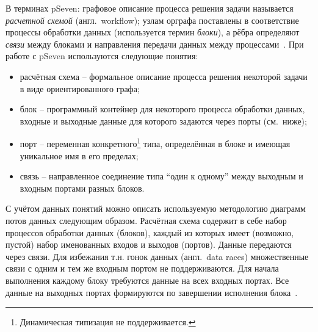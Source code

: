 В терминах \textsf{pSeven}: графовое описание процесса решения задачи называется \textit{расчетной схемой} (англ.~workflow); узлам орграфа поставлены в соответствие процессы обработки данных (используется термин \textit{блоки}), а рёбра определяют \textit{связи} между блоками и направления передачи данных между процессами~\cite{NazarenkoDFM2015}. При работе с pSeven используются следующие понятия:
\begin{itemize}
  \item \textsf{расчётная схема} -- формальное описание процесса решения некоторой задачи в виде ориентированного графа;
  \item \textsf{блок} -- программный контейнер для некоторого процесса обработки данных, входные и выходные данные для которого задаются через порты (см.~ниже);
  \item \textsf{порт} -- переменная конкретного\footnote{Динамическая типизация не поддерживается.} типа, определённая в блоке и имеющая уникальное имя в его пределах;
  \item \textsf{связь} -- направленное соединение типа ``один к одному'' между выходным и входным портами разных блоков.
\end{itemize}

С учётом данных понятий можно описать используемую методологию диаграмм потов данных следующим образом. Расчётная схема содержит в себе набор процессов обработки данных (блоков), каждый из которых имеет (возможно, пустой) набор именованных входов и выходов (портов). Данные передаются через связи. Для избежания т.н. гонок данных (англ.~data races) множественные связи с одним и тем же входным портом не поддерживаются. Для начала выполнения каждому блоку требуются данные на всех входных портах. Все данные на выходных портах формируются по завершении исполнения блока~\cite{NazarenkoDFM2015}.

